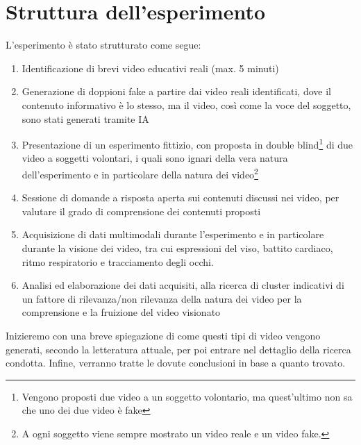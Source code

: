 \section*{Struttura dell'esperimento}

L'esperimento è stato strutturato come segue:
\begin{enumerate}
\item Identificazione di brevi video educativi reali (max. 5 minuti)
\item Generazione di doppioni fake a partire dai video reali identificati, dove il contenuto informativo è lo stesso, ma il video, così come la voce del soggetto, sono stati generati tramite IA
\item Presentazione di un esperimento fittizio, con proposta in double blind\footnote{Vengono proposti due video a un soggetto volontario, ma quest'ultimo non sa che uno dei due video è fake} di due video a soggetti volontari, i quali sono ignari della vera natura dell'esperimento e in particolare della natura dei video\footnote{A ogni soggetto viene sempre mostrato un video reale e un video fake.}
\item Sessione di domande a risposta aperta sui contenuti discussi nei video, per valutare il grado di comprensione dei contenuti proposti
\item Acquisizione di dati multimodali durante l'esperimento e in particolare durante la visione dei video, tra cui espressioni del viso, battito cardiaco, ritmo respiratorio e tracciamento degli occhi.
\item Analisi ed elaborazione dei dati acquisiti, alla ricerca di cluster indicativi di un fattore di rilevanza/non rilevanza della natura dei video per la comprensione e la fruizione del video visionato
\end{enumerate}

Inizieremo con una breve spiegazione di come questi tipi di video vengono generati, secondo la letteratura attuale, per poi entrare nel dettaglio della ricerca condotta. Infine, verranno tratte le dovute conclusioni in base a quanto trovato.

\clearpage